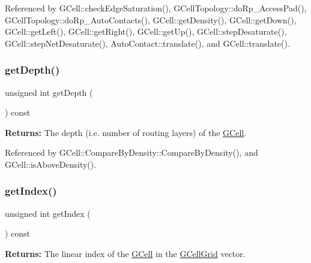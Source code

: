 Referenced by G\+Cell\+::check\+Edge\+Saturation(), G\+Cell\+Topology\+::do\+Rp\+\_\+\+Access\+Pad(), G\+Cell\+Topology\+::do\+Rp\+\_\+\+Auto\+Contacts(), G\+Cell\+::get\+Density(), G\+Cell\+::get\+Down(), G\+Cell\+::get\+Left(), G\+Cell\+::get\+Right(), G\+Cell\+::get\+Up(), G\+Cell\+::step\+Desaturate(), G\+Cell\+::step\+Net\+Desaturate(), Auto\+Contact\+::translate(), and G\+Cell\+::translate().

\mbox{\label{classKatabatic_1_1GCell_a6c4d9081746b8daa3e45e5e3dd185b60}} 
\subsubsection{\texorpdfstring{get\+Depth()}{getDepth()}}
{\footnotesize\ttfamily unsigned int get\+Depth (\begin{DoxyParamCaption}{ }\end{DoxyParamCaption}) const\hspace{0.3cm}{\ttfamily [inline]}}

{\bfseries Returns\+:} The depth (i.\+e. number of routing layers) of the \hyperlink{classKatabatic_1_1GCell}{G\+Cell}. 

Referenced by G\+Cell\+::\+Compare\+By\+Density\+::\+Compare\+By\+Density(), and G\+Cell\+::is\+Above\+Density().

\mbox{\label{classKatabatic_1_1GCell_a762de91e7869ca544ff034b99fc2e0a6}} 
\subsubsection{\texorpdfstring{get\+Index()}{getIndex()}}
{\footnotesize\ttfamily unsigned int get\+Index (\begin{DoxyParamCaption}{ }\end{DoxyParamCaption}) const\hspace{0.3cm}{\ttfamily [inline]}}

{\bfseries Returns\+:} The linear index of the \hyperlink{classKatabatic_1_1GCell}{G\+Cell} in the \hyperlink{classKatabatic_1_1GCellGrid}{G\+Cell\+Grid} vector.

